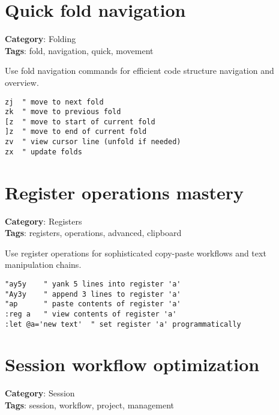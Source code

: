 {{{{\section{Quick fold navigation}

\textbf{Category}: Folding\\ \textbf{Tags}: fold, navigation, quick, movement
\vspace{0.5cm}

Use fold navigation commands for efficient code structure navigation and overview.

\begin{Exa*}{}
\begin{Verbatim}[fontsize=\footnotesize, breaklines, breakanywhere]
zj  " move to next fold
zk  " move to previous fold  
[z  " move to start of current fold
]z  " move to end of current fold
zv  " view cursor line (unfold if needed)
zx  " update folds
\end{Verbatim}
\end{Exa*}

\section{Register operations mastery}

\textbf{Category}: Registers\\ \textbf{Tags}: registers, operations, advanced, clipboard
\vspace{0.5cm}

Use register operations for sophisticated copy-paste workflows and text manipulation chains.

\begin{Exa*}{}
\begin{Verbatim}[fontsize=\footnotesize, breaklines, breakanywhere]
"ay5y    " yank 5 lines into register 'a'
"Ay3y    " append 3 lines to register 'a'
"ap      " paste contents of register 'a'
:reg a   " view contents of register 'a'
:let @a='new text'  " set register 'a' programmatically
\end{Verbatim}
\end{Exa*}

\section{Session workflow optimization}

\textbf{Category}: Session\\ \textbf{Tags}: session, workflow, project, management
\vspace{0.5cm}

}}}}
